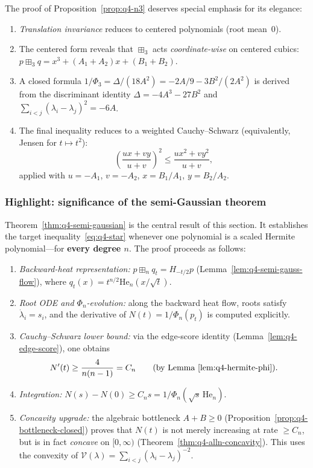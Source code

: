 The proof of Proposition~\ref{prop:q4-n3} deserves special emphasis
for its elegance:
\begin{enumerate}[nosep]
\item \emph{Translation invariance} reduces to centered polynomials
  (root mean~$0$).
\item The centered form reveals that $\boxplus_3$ acts \emph{coordinate-wise}
  on centered cubics:
  $p\boxplus_3 q = x^3+(A_1+A_2)x+(B_1+B_2)$.
\item A closed formula
  $1/\Phi_3 = \Delta/(18A^2)=-2A/9-3B^2/(2A^2)$
  is derived from the discriminant identity $\Delta=-4A^3-27B^2$
  and $\sum_{i<j}(\lambda_i-\lambda_j)^2=-6A$.
\item The final inequality reduces to a weighted Cauchy--Schwarz
  (equivalently, Jensen for $t\mapsto t^2$):
  \[
  \left(\frac{ux+vy}{u+v}\right)^{\!2}
  \le
  \frac{ux^2+vy^2}{u+v},
  \]
  applied with $u=-A_1$, $v=-A_2$, $x=B_1/A_1$, $y=B_2/A_2$.
\end{enumerate}

\subsubsection*{Highlight: significance of the semi-Gaussian theorem}

Theorem~\ref{thm:q4-semi-gaussian} is the central result of this
section. It establishes the target inequality~\eqref{eq:q4-star}
whenever one polynomial is a scaled Hermite polynomial---for
\textbf{every degree $n$}. The proof proceeds as follows:
\begin{enumerate}[nosep]
\item \emph{Backward-heat representation:}
  $p\boxplus_n q_t = H_{-t/2}p$
  (Lemma~\ref{lem:q4-semi-gauss-flow}), where
  $q_t(x)=t^{n/2}\mathrm{He}_n(x/\sqrt{t})$.
\item \emph{Root ODE and $\Phi_n$-evolution:}
  along the backward heat flow, roots satisfy $\dot\lambda_i=s_i$,
  and the derivative of $N(t)=1/\Phi_n(p_t)$ is computed explicitly.
\item \emph{Cauchy--Schwarz lower bound:}
  via the edge-score identity
  (Lemma~\ref{lem:q4-edge-score}), one obtains
  \[
  N'(t)\ge \frac{4}{n(n-1)}=C_n
  \qquad\text{(by Lemma~\ref{lem:q4-hermite-phi})}.
  \]
\item \emph{Integration:}
  $N(s)-N(0)\ge C_n s = 1/\Phi_n(\sqrt{s}\,\mathrm{He}_n)$.
\item \emph{Concavity upgrade:}
  the algebraic bottleneck $A+B\ge 0$
  (Proposition~\ref{prop:q4-bottleneck-closed}) proves that $N(t)$
  is not merely increasing at rate $\ge C_n$, but is in fact
  \emph{concave} on $[0,\infty)$
  (Theorem~\ref{thm:q4-alln-concavity}).
  This uses the convexity of
  $\mathcal V(\lambda)=\sum_{i<j}(\lambda_i-\lambda_j)^{-2}$.
\end{enumerate}
